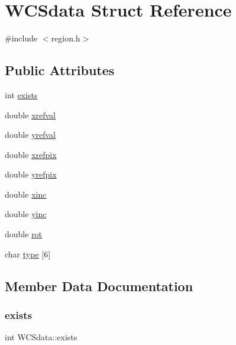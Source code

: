 \hypertarget{struct_w_c_sdata}{}\section{W\+C\+Sdata Struct Reference}
\label{struct_w_c_sdata}


{\ttfamily \#include $<$region.\+h$>$}

\subsection*{Public Attributes}
\begin{DoxyCompactItemize}
\item 
int \hyperlink{struct_w_c_sdata_a2d461e2528c8b86eec6dac68d94430c5}{exists}
\item 
double \hyperlink{struct_w_c_sdata_a678ce02802586e38b2c2873d025301d2}{xrefval}
\item 
double \hyperlink{struct_w_c_sdata_a782ed4e56739fdd59b4d54cdbdb5a258}{yrefval}
\item 
double \hyperlink{struct_w_c_sdata_ace9bbeb37e8835eab55f6c91849535da}{xrefpix}
\item 
double \hyperlink{struct_w_c_sdata_a69536087b489da498aa37e80bfdcf931}{yrefpix}
\item 
double \hyperlink{struct_w_c_sdata_a6f9fba04439fff7a39ba172d642c6125}{xinc}
\item 
double \hyperlink{struct_w_c_sdata_ad913189530c9b25c0cf3c54e965f9467}{yinc}
\item 
double \hyperlink{struct_w_c_sdata_af5f13ae7700c177222106856c2d7f12e}{rot}
\item 
char \hyperlink{struct_w_c_sdata_a29245749241709c2f83fb15d03553a9d}{type} \mbox{[}6\mbox{]}
\end{DoxyCompactItemize}


\subsection{Member Data Documentation}
\mbox{\label{struct_w_c_sdata_a2d461e2528c8b86eec6dac68d94430c5}} 
\subsubsection{\texorpdfstring{exists}{exists}}
{\footnotesize\ttfamily int W\+C\+Sdata\+::exists}

